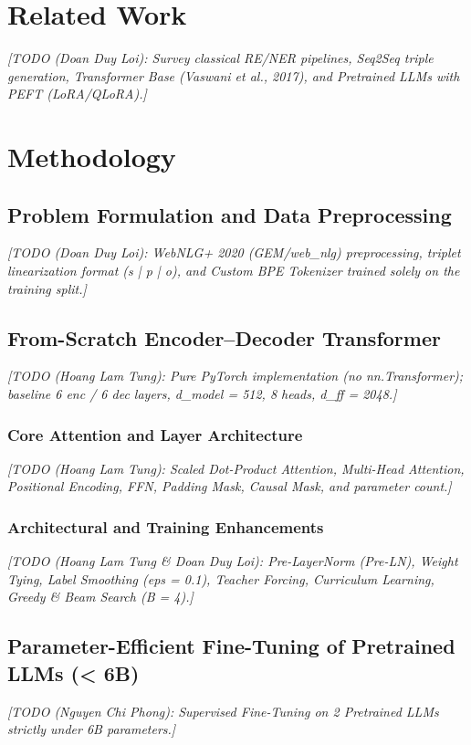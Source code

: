 \documentclass[10pt, a4paper]{article}
\newcommand{\todo}[1]{\par\noindent\textit{[#1]}\par}
\begin{document}
\section{Related Work}
\todo{TODO (Doan Duy Loi): Survey classical RE/NER pipelines, Seq2Seq triple generation, Transformer Base (Vaswani et al., 2017), and Pretrained LLMs with PEFT (LoRA/QLoRA).}

\section{Methodology}

\subsection{Problem Formulation and Data Preprocessing}
\todo{TODO (Doan Duy Loi): WebNLG+ 2020 (GEM/web\_nlg) preprocessing, triplet linearization format (s | p | o), and Custom BPE Tokenizer trained solely on the training split.}

\subsection{From-Scratch Encoder--Decoder Transformer}
\todo{TODO (Hoang Lam Tung): Pure PyTorch implementation (no nn.Transformer); baseline 6 enc / 6 dec layers, d\_model = 512, 8 heads, d\_ff = 2048.}

\subsubsection{Core Attention and Layer Architecture}
\todo{TODO (Hoang Lam Tung): Scaled Dot-Product Attention, Multi-Head Attention, Positional Encoding, FFN, Padding Mask, Causal Mask, and parameter count.}

\subsubsection{Architectural and Training Enhancements}
\todo{TODO (Hoang Lam Tung \& Doan Duy Loi): Pre-LayerNorm (Pre-LN), Weight Tying, Label Smoothing (eps = 0.1), Teacher Forcing, Curriculum Learning, Greedy \& Beam Search (B = 4).}

\subsection{Parameter-Efficient Fine-Tuning of Pretrained LLMs (< 6B)}
\todo{TODO (Nguyen Chi Phong): Supervised Fine-Tuning on 2 Pretrained LLMs strictly under 6B parameters.}
\end{document}
